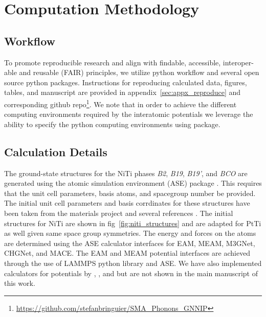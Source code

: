 \documentclass[preprint,colorlinks=true,linkcolor=black,citecolor=black]{elsarticle}
\begin{document}
\section{Computation Methodology}
\label{sec:methods}

\subsection{Workflow}
\label{sec:workflow}
To promote reproducible research and align with findable, accessible,
interoper-able and reusable (FAIR) principles\cite{Walsh2024}, we
utilize \showyourwork python workflow\cite{Luger2021} and several open
source python packages. Instructions for reproducing calculated data,
figures, tables, and manuscript are provided in
appendix~\ref{sec:appx_reproduce} and corresponding github
repo\footnote{\url{https://github.com/stefanbringuier/SMA_Phonons_GNNIP}}. We
note that in order to achieve the different computing environments
required by the interatomic potentials we leverage the ability to
specify the python computing environments using
\href{https://github.com/showyourwork/showyourwork}{\showyourwork}
package.\par

\subsection{Calculation Details}
\label{sec:calc_details}
The ground-state structures for the NiTi phases \textit{B2},
\textit{B19}, \textit{B19'}, and \textit{BCO} are generated using the
atomic simulation environment (ASE) package \cite{Larsen2017}. This
requires that the unit cell parameters, basis atoms, and spacegroup
number be provided. The initial unit cell parameters and basis
corrdinates for these structures have been taken from the materials
project \cite{Jain2013} and several references
\cite{Haskins2016,Kadkhodaei2018}. The initial structures for NiTi are
shown in fig~\ref{fig:niti_structures} and are adapted for PtTi as
well given same space group symmetries. The energy and forces on the
atoms are determined using the ASE calculator interfaces for EAM,
MEAM, M3GNet, CHGNet, and
MACE.\cite{Mutter2010,Zhong2011,Ko2015,Kim2017,Chen2022,Deng2023,Batatia2022}
The EAM and MEAM potential interfaces are achieved through the use of
LAMMPS python library \cite{Thompson2022} and ASE. We have also
implemented calculators for potentials by \cite{Kavousi2019},
\cite{Wang2018}, and \cite{Choudhary2021} but are not shown in the
main manuscript of this work.\par
\end{document}
